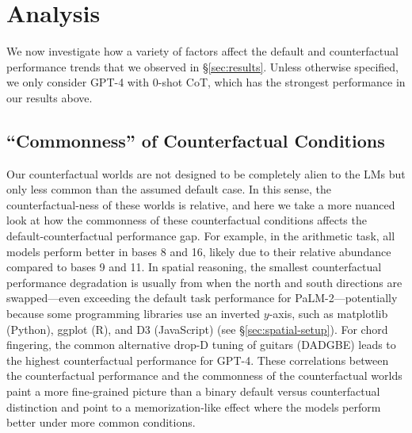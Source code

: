 



\section{Analysis} \label{sec:analysis}

We now investigate how a variety of factors affect the default and counterfactual performance trends that we observed in \S\ref{sec:results}.
Unless otherwise specified, we only consider GPT-4 with 0-shot CoT, which has the strongest performance in our results above.

\subsection{``Commonness'' of Counterfactual Conditions} \label{sec:analysis-world-commonness}
Our counterfactual worlds are  not designed to be completely alien to the LMs but only less common than the assumed default case.
In this sense, the counterfactual-ness of these worlds is relative, and here we take a more nuanced look at how the commonness of these counterfactual conditions affects the default-counterfactual performance gap.
For example, in the arithmetic task, all models perform better in bases 8 and 16, likely due to their relative abundance compared to  bases 9 and 11.
In spatial reasoning, the smallest counterfactual performance degradation is usually from when the north and south directions are swapped---even exceeding the default task performance for PaLM-2---potentially because some programming libraries use an inverted $y$-axis, such as matplotlib (Python), ggplot (R), and D3 (JavaScript) (see \S\ref{sec:spatial-setup}).
For chord fingering, the common alternative drop-D tuning of guitars (DADGBE) leads to the highest counterfactual performance for GPT-4.
These correlations between the counterfactual performance and the commonness of the counterfactual worlds paint a more fine-grained picture than a binary default versus counterfactual distinction and point to a memorization-like
effect where the models perform better under more common conditions.

